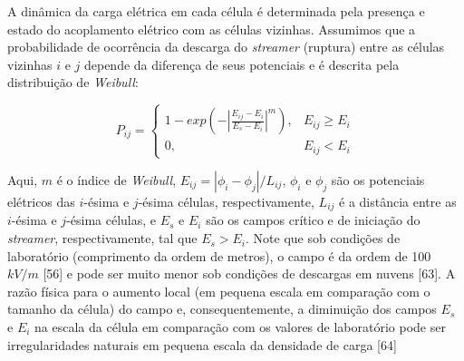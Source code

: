 \documentclass[a4paper, 12pt, onecolumn,singlespacing]{article}
\begin{document}
	A dinâmica da carga elétrica em cada célula é determinada pela presença e estado do acoplamento elétrico com as células vizinhas. Assumimos que a probabilidade de ocorrência da descarga do \textit{streamer} (ruptura) entre as células vizinhas $i$ e $j$ depende da diferença de seus potenciais e é descrita pela distribuição de \textit{Weibull}:
	
	\begin{equation}
		P_{ij} = \begin{cases}
					1 - exp \left( -\left| \frac{E_{ij} - E_i}{E_s - E_i} \right|^m\right ), &  E_{ij} \geq E_i \\ 
					0, & E_{ij} < E_i 
				 \end{cases}
		\label{eqn_1}
	\end{equation}
	
	Aqui, $m$ é o índice de \textit{Weibull}, $E_{ij} = |\phi_i - \phi_j |/L_{ij}$, $\phi_i$ e $\phi_j$ são os potenciais elétricos das $i$-ésima e $j$-ésima células, respectivamente, $L_{ij}$ é a distância entre as $i$-ésima e $j$-ésima células, e $E_s$ e $E_i$ são os campos crítico e de iniciação do \textit{streamer}, respectivamente, tal que $E_s > E_i$. Note que sob condições de laboratório (comprimento da ordem de metros), o campo é da ordem de 100 $kV/m$ [56] e pode ser muito menor sob condições de descargas em nuvens [63]. A razão física para o aumento local (em pequena escala em comparação com o tamanho da célula) do campo e, consequentemente, a diminuição dos campos $E_s$ e $E_i$ na escala da célula em comparação com os valores de laboratório pode ser irregularidades naturais em pequena escala da densidade de carga [64]
\end{document}
